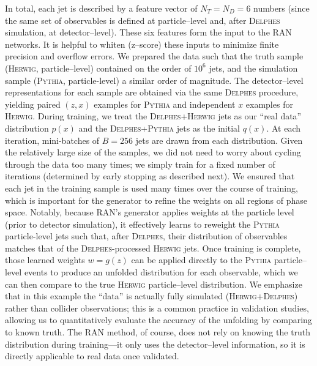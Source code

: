 {{            %
            In total, each jet is described by a feature vector of $N_T = N_D = 6$ numbers (since the same set of observables is defined at particle--level and, after \textsc{Delphes} simulation, at detector--level).
            These six features form the input to the RAN networks.
            It is helpful to whiten (z--score)\kd{} these inputs to minimize finite precision and overflow errors.
            We prepared the data such that the truth sample (\textsc{Herwig}, particle--level) contained on the order of $10^6$ jets, and the simulation sample (\textsc{Pythia}, particle-level) a similar order of magnitude.
            The detector--level representations for each sample are obtained via the same \textsc{Delphes} procedure, yielding paired $(z, x)$ examples for \textsc{Pythia} and independent $x$ examples for \textsc{Herwig}.
            During training, we treat the \textsc{Delphes+Herwig} jets as our “real data” distribution $p(x)$ and the \textsc{Delphes+Pythia} jets as the initial $q(x)$. %
            At each iteration, mini-batches of $B=256$ jets are drawn from each distribution.
            Given the relatively large size of the samples, we did not need to worry about cycling through the data too many times; we simply train for a fixed number of iterations (determined by early stopping as described next).
            We ensured that each jet in the training sample is used many times over the course of training, which is important for the generator to refine the weights on all regions of phase space.
            Notably, because RAN’s generator applies weights at the particle level (prior to detector simulation), it effectively learns to reweight the \textsc{Pythia} particle-level jets such that, after \textsc{Delphes}, their distribution of observables matches that of the \textsc{Delphes}-processed \textsc{Herwig} jets.
            Once training is complete, those learned weights $w = g(z)$ can be applied directly to the \textsc{Pythia} particle--level events to produce an unfolded distribution for each observable, which we can then compare to the true \textsc{Herwig} particle--level distribution.
            We emphasize that in this example the “data” is actually fully simulated (\textsc{Herwig+Delphes}) rather than collider observations;
            this is a common practice in validation studies, allowing us to quantitatively evaluate the accuracy of the unfolding by comparing to known truth.
            The RAN method, of course, does not rely on knowing the truth distribution during training—it only uses the detector--level information, so it is directly applicable to real data once validated.

}}
